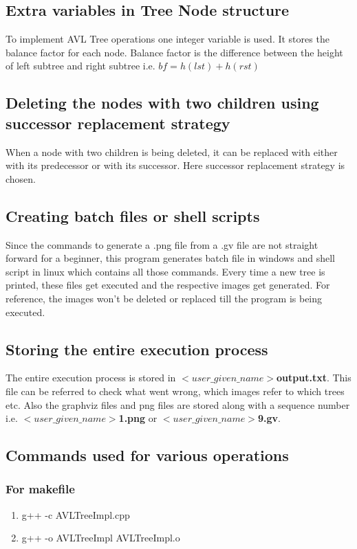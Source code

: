 \documentclass{article}
\begin{document}
\subsection{Extra variables in Tree Node structure}
To implement AVL Tree operations one integer variable is used. It stores the balance factor for each node. Balance factor is the difference between the height of left subtree and right subtree i.e. $bf = h(lst)+h(rst)$

\subsection{Deleting the nodes with two children using successor replacement strategy}
When a node with two children is being deleted, it can be replaced with either with its predecessor or with its successor. Here successor replacement strategy is chosen.

\subsection{Creating batch files or shell scripts}
Since the commands to generate a .png file from a .gv file are not straight forward for a beginner, this program generates batch file in windows and shell script in linux which contains all those commands. Every time a new tree is printed, these files get executed and the respective images get generated. For reference, the images won't be deleted or replaced till the program is being executed.

\subsection{Storing the entire execution process}
The entire execution process is stored in \textbf{$<user\_given\_name>$output.txt}. This file can be referred to check what went wrong, which images refer to which trees etc. Also the graphviz files and png files are stored along with a sequence number i.e. \textbf{$<user\_given\_name>$1.png} or \textbf{$<user\_given\_name>$9.gv}.

\subsection{Commands used for various operations}
\subsubsection{For makefile}
\begin{enumerate}
	\item g++ -c AVLTreeImpl.cpp
	\item g++ -o AVLTreeImpl AVLTreeImpl.o
\end{enumerate}
\end{document}
